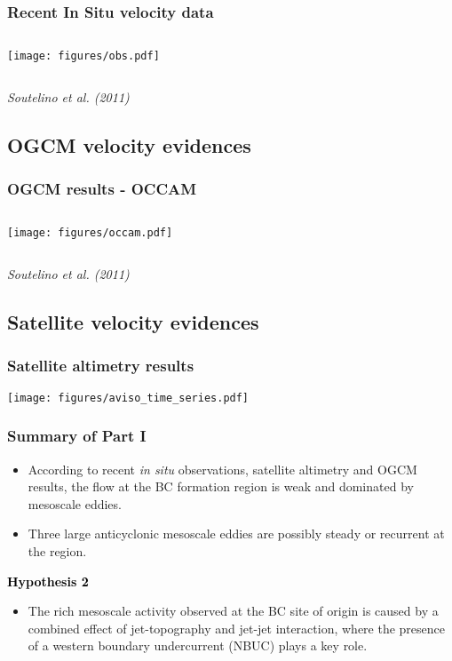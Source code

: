 \documentclass{beamer}
\begin{document}
\frame
{
  \frametitle{Recent In Situ velocity data}
\begin{columns}
\begin{column}{15cm}
\hspace{-1cm}
\texttt{[image: figures/obs.pdf]}
\end{column}
\end{columns}
\vspace{-0.5cm}
\footnotesize{\it Soutelino et al. (2011)}
}

\subsection{OGCM velocity evidences}


\frame
{
  \frametitle{OGCM results - OCCAM}
\begin{columns}
\begin{column}{15cm}
\hspace{-1cm}
\texttt{[image: figures/occam.pdf]}
\end{column}
\end{columns}
\vspace{-0.5cm}
\footnotesize{\it Soutelino et al. (2011)}
}

\subsection{Satellite velocity evidences}


\frame
{
  \frametitle{Satellite altimetry results}
\texttt{[image: figures/aviso\_time\_series.pdf]}
}


\frame
{
  \frametitle{Summary of Part I}
\begin{itemize}
\item{According to recent {\it in situ} observations, satellite altimetry and OGCM results, the
flow at the BC formation region is weak and dominated by mesoscale eddies.}
\item{Three large anticyclonic mesoscale eddies are possibly steady or recurrent at the region. } 
\end{itemize} 

\begin{alertblock}{\textcolor{black}{\bf Hypothesis 2}}
  \begin{itemize}
    \item{The rich mesoscale activity observed at the BC site of origin is caused by a combined
          effect of jet-topography and jet-jet interaction, where the presence of a western
          boundary undercurrent (NBUC) plays a key role.}
  \end{itemize}
\end{alertblock}
}
\end{document}
